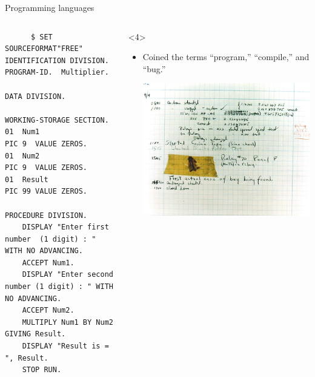 \documentclass[aspectratio=169]{beamer}
\begin{document}
\begin{frame}[fragile]{Programming languages}
\begin{columns}
\begin{onlyenv}
\begin{itemize}
\vspace{0.1 cm}
\tiny
\begin{verbatim}
      $ SET SOURCEFORMAT"FREE"
IDENTIFICATION DIVISION.
PROGRAM-ID.  Multiplier.

DATA DIVISION.

WORKING-STORAGE SECTION.
01  Num1                                PIC 9  VALUE ZEROS.
01  Num2                                PIC 9  VALUE ZEROS.
01  Result                              PIC 99 VALUE ZEROS.

PROCEDURE DIVISION.
    DISPLAY "Enter first number  (1 digit) : " WITH NO ADVANCING.
    ACCEPT Num1.
    DISPLAY "Enter second number (1 digit) : " WITH NO ADVANCING.
    ACCEPT Num2.
    MULTIPLY Num1 BY Num2 GIVING Result.
    DISPLAY "Result is = ", Result.
    STOP RUN.
\end{verbatim}
\normalsize
\end{itemize}
\end{onlyenv}\begin{onlyenv}<4>
\begin{itemize}
\item Coined the terms ``program,'' ``compile,'' and ``bug.''

\begin{center}
\includegraphics[width=0.7\linewidth]{PLOTS/First_Computer_Bug,_1945.jpg}
\end{center}
\end{itemize}
\end{onlyenv}


\end{columns}
\end{frame}
\end{document}
